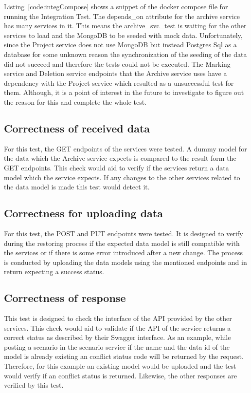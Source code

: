 Listing~\ref{code:integCompose} shows a snippet of the docker compose file for running the Integration Test. The depends\_on attribute for the archive service
has many services in it. This means the archive\_svc\_test is waiting for the other services to load and the MongoDB to be seeded with mock data. Unfortunately,
since the Project service does not use MongoDB but instead Postgres Sql as a database for some unknown reason the synchronization of the seeding of the data
did not succeed and therefore the tests could not be executed. The
Marking service and Deletion service endpoints that the Archive service uses have a dependency with the Project service  which resulted as a unsuccessful test
for them. Although, it is a point of interest in the future to investigate to figure out the reason for this and complete the whole test.

\subsection{Correctness of received data}
For this test, the GET endpoints of the services were tested. A dummy model for the data which the Archive service expects is compared to the result
form the GET endpoints. This check would aid to verify if the services return a data model which the service expects. If any changes to the other services
related to the data model is made this test would detect it. 

\subsection{Correctness for uploading data}
For this test, the POST and PUT endpoints were tested. It is designed to verify during the restoring process if the expected data model 
is still compatible with the services or if there is some error introduced after a new change. The process is conducted by uploading the 
data models using the mentioned endpoints and in return expecting a success status.

\subsection{Correctness of response}
This test is designed to check the interface of the API provided by the other services. This check would aid to validate if the API of the
service returns a correct status as described by their Swagger interface. As an example, while posting a scenario in the scenario service if the
name and the data id of the model is already existing an conflict status code will be returned by the request. Therefore, for this example an existing
model would be uploaded and the test would verify if an conflict status is returned. Likewise, the other responses are verified by this test. 

